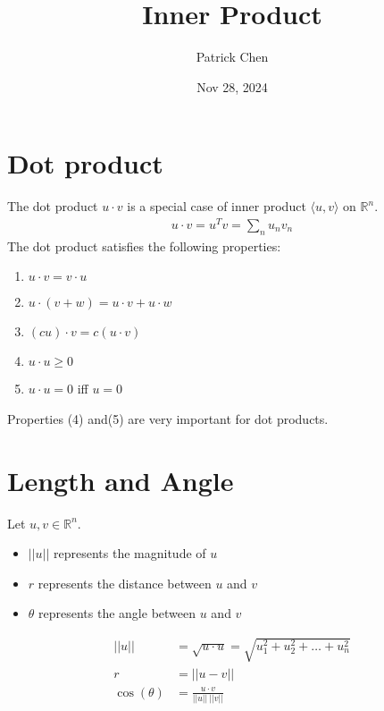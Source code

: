 \documentclass{article}
\title{Inner Product}
\author{Patrick Chen}
\date{Nov 28, 2024}
\theoremstyle{mytheoremstyle}
\theoremstyle{mytheoremstyle}
\theoremstyle{myproblemstyle}
\begin{document}
    \maketitle
    \section*{Dot product}
    The dot product $u\cdot v$ is a special case of inner product $\langle
    u,v\rangle$ on $\mathbb{R}^n$.
    \begin{align*}
        u\cdot v = u^T v = \sum_n u_nv_n
    \end{align*}
    The dot product satisfies the following properties:
    \begin{enumerate}
        \item $u\cdot v = v\cdot u$
        \item $u\cdot (v+w) = u\cdot v + u\cdot w$
        \item $(cu)\cdot v = c(u\cdot v)$
        \item $u\cdot u \ge 0$
        \item $u\cdot u = 0$ iff $u=0$
    \end{enumerate}
    Properties (4) and(5) are very important for dot products.

    \section*{Length and Angle}
    Let $u,v\in\mathbb{R}^n$.
    \begin{itemize}
        \item $||u||$ represents the magnitude of $u$
        \item $r$ represents the distance between $u$ and $v$
        \item $\theta$ represents the angle between $u$ and $v$
    \end{itemize}
    \begin{align*}
        ||u|| &= \sqrt{u\cdot u} = \sqrt{u_1^2 +u_2^2 + \dots + u_n^2} \\
        r &= ||u-v|| \\
        \cos(\theta)  &= \frac{u\cdot v}{||u||\ ||v||} \\
    \end{align*}
\end{document}
